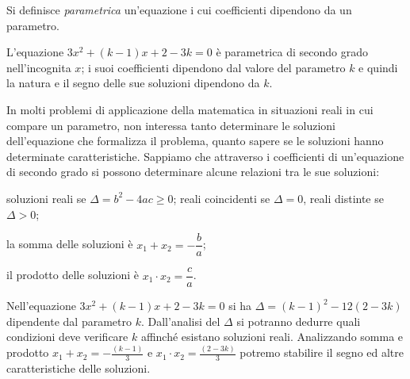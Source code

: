 \begin{definizione}

Si definisce \emph{parametrica} un'equazione i cui coefficienti dipendono da un parametro.
\end{definizione}

L'equazione $3 x^{2} + ( k - 1 ) x + 2 - 3 k= 0$ è parametrica di secondo grado nell'incognita $x$; i suoi coefficienti dipendono dal valore del parametro $k$ e quindi la natura e il segno delle sue soluzioni dipendono da $k$.

In molti problemi di applicazione della matematica in situazioni reali in cui compare un parametro, non interessa tanto determinare le soluzioni dell'equazione che formalizza il problema, quanto sapere se le soluzioni hanno determinate caratteristiche.
Sappiamo che attraverso i coefficienti di un'equazione di secondo grado si possono determinare alcune relazioni tra le sue soluzioni:
\begin{itemize*}
\item soluzioni reali se $\Delta = b^{2} - 4 a c \geq 0$; reali coincidenti se $\Delta = 0$, reali distinte se $\Delta > 0$;
\item la somma delle soluzioni è $x_{1} + x_{2} = - \dfrac{b}{a}$;
\item il prodotto delle soluzioni è $x_{1} \cdot x_{2} = \dfrac{c}{a}$.
\end{itemize*}

Nell'equazione $3 x^{2} + ( k - 1 ) x + 2 - 3 k = 0$ si ha $\Delta = ( k - 1 )^{2} - 12 ( 2 - 3 k )$ dipendente dal parametro $k$.
Dall'analisi del $\Delta$ si potranno dedurre quali condizioni deve verificare $k$ affinché esistano soluzioni reali. Analizzando somma e prodotto
$x_{1} + x_{2} = - \frac{( k - 1 )}{3}$ e $x_{1} \cdot x_{2} =\frac{( 2 - 3 k )}{3}$ potremo stabilire il segno ed altre caratteristiche delle soluzioni.

